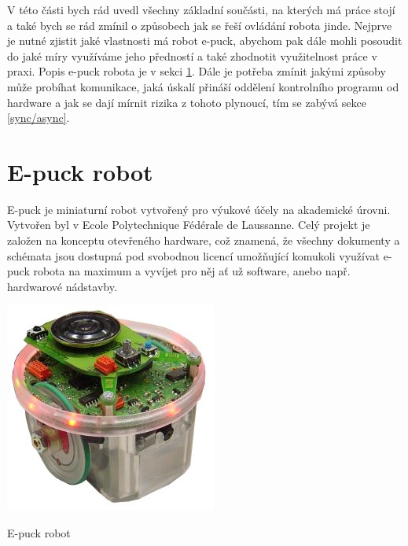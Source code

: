 \documentclass[12pt,notitlepage]{report}
\begin{document}
    V této části bych rád uvedl všechny základní součásti, na kterých má práce
    stojí a také bych se rád zmínil o způsobech jak se řeší ovládání robota
    jinde. Nejprve je nutné zjistit jaké vlastnosti má robot e-puck, abychom
    pak dále mohli posoudit do jaké míry využíváme jeho předností a také
    zhodnotit využitelnost práce v praxi. Popis e-puck robota je v sekci
    \ref{e-puck robot}. Dále je potřeba zmínit jakými způsoby může probíhat
    komunikace, jaká úskalí přináší oddělení kontrolního programu od hardware a
    jak se dají mírnit rizika z tohoto plynoucí, tím se zabývá sekce
    \ref{sync/async}.

    \section{E-puck robot}
    \label{e-puck robot}
    E-puck je miniaturní robot vytvořený pro výukové účely na akademické
    úrovni. Vytvořen byl v Ecole Polytechnique Fédérale de Laussanne. Celý
    projekt je založen na konceptu otevřeného hardware, což znamená, že všechny
    dokumenty a schémata jsou dostupná pod svobodnou licencí umožňující
    komukoli využívat e-puck robota na maximum a vyvíjet pro něj ať už
    software, anebo např. hardwarové nádstavby.

    \begin{listing}
        \begin{center}
            \includegraphics[scale=0.5]{e-puck.jpg}
            \caption{E-puck robot}
        \end{center}
    \end{listing}
\end{document}

